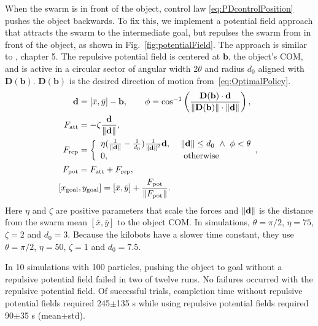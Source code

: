 When the swarm is in front of the object, control law \eqref{eq:PDcontrolPosition} pushes the object backwards.  To fix this, we implement a potential field approach that attracts the swarm to the intermediate goal, but repulses the swarm from in front of the object, as shown in Fig.~\ref{fig:potentialField}. The approach is similar to \cite{spong2008robot}, chapter 5.
The repulsive potential field is centered at $\mathbf{b}$, the object's COM, and is active in a circular sector of angular width 2$\theta$ and radius $d_0$ aligned with $\mathbf{D}(\mathbf{b})$. $\mathbf{D}(\mathbf{b})$ is the desired direction of motion from~\eqref{eq:OptimalPolicy}.
\begin{align}
\mathbf{d} &=  [\bar{x},\bar{y}] - \mathbf{b}, \qquad   \phi =\cos^{-1}\left( \frac{ \mathbf{D}(\mathbf{b}) \cdot  \mathbf{d}  }{\norm{\mathbf{D}(\mathbf{b})} \cdot \norm{\mathbf{d}} } \right), \nonumber \\ 
F_{\rm{att}} &= -\zeta \frac{\mathbf{d}  }{ \norm{\mathbf{d}}}, \nonumber\\
 F_{\rm{rep}} &=  \left\{
\begin{array}{ll}
      \eta( \frac{1}{\norm{\mathbf{d}}}- \frac{1}{d_0}) \frac{1}{\norm{\mathbf{d}}^2} \mathbf{d}, ~& \norm{\mathbf{d}} \leq d_0~\wedge~\phi <  \theta \\
      0, & \textrm{ otherwise} \nonumber \\
\end{array},
\right.\\
F_{\rm{pot}} &= F_{\rm{att}} + F_{\rm{rep}} \label{eq:potentialfield}, \nonumber\\
[x_{\rm{goal}}&, y_{\rm{goal}}] =  [\bar{x},\bar{y}]  + \frac{F_{\rm{pot}}}{\norm{F_{\rm{pot}}}}.
\end{align}
Here  $\eta$ and $\zeta$ are positive parameters that scale the forces and $\left\lVert\mathbf{d}\right\rVert$ is the distance from the swarm mean $ [\bar{x},\bar{y}]$ to the object COM.
In simulations, $\theta =  \pi/2$,  $\eta  = 75$, $\zeta = 2$ and $d_0 = 3$. Because the kilobots have a slower time constant, they use $\theta =  \pi/2$,  $\eta  = 50$, $\zeta = 1$ and $d_0 = 7.5$. 

In 10 simulations with 100 particles, pushing the object to goal without a repulsive potential field failed in two of twelve runs. No failures occurred with the repulsive potential field.  Of successful trials, completion time without repulsive potential fields required 245$\pm$135 s while using repulsive potential fields required 90$\pm$35 s (mean$\pm$std).

